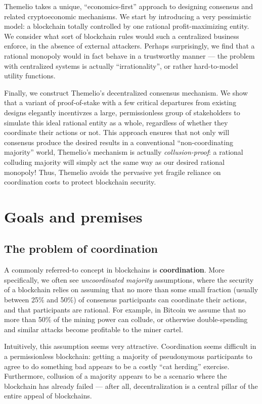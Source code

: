 \documentclass[letterpaper,12pt,oneside]{article}
\begin{document}
Themelio takes a unique, ``economics-first'' approach to designing consensus and related cryptoeconomic mechanisms. We start by introducing a very pessimistic model: a blockchain totally controlled by one rational profit-maximizing entity. We consider what sort of blockchain rules would such a centralized business enforce, in the absence of external attackers. Perhaps surprisingly, we find that a rational monopoly would in fact behave in a trustworthy manner --- the problem with centralized systems is actually ``irrationality'', or rather hard-to-model utility functions.

Finally, we construct Themelio's decentralized consensus mechanism.
We show that a variant of proof-of-stake with a few critical departures from existing designs elegantly incentivzes a large, permissionless group of stakeholders to simulate this ideal rational entity as a whole, regardless of whether they coordinate their actions or not. This approach ensures that not only will consensus produce the desired results in a conventional ``non-coordinating majority'' world, Themelio's mechanism is actually \emph{collusion-proof}: a rational colluding majority will simply act the same way as our desired rational monopoly! Thus, Themelio avoids the pervasive yet fragile reliance on coordination costs to protect blockchain security.

\section{Goals and premises}

\subsection{The problem of coordination}

A commonly referred-to concept in blockchains is \textbf{coordination}. More specifically, we often see \emph{uncoordinated majority} assumptions, where the security of a blockchain relies on assuming that no more than some small fraction (usually between 25\% and 50\%) of consensus participants can coordinate their actions, and that participants are rational. For example, in Bitcoin we assume that no more than 50\% of the mining power can collude, or otherwise double-spending and similar attacks become profitable to the miner cartel.

Intuitively, this assumption seems very attractive. Coordination seems difficult in a permissionless blockchain: getting a majority of pseudonymous participants to agree to do something bad appears to be a costly ``cat herding'' exercise. Furthermore, collusion of a majority appears to be a scenario where the blockchain has already failed --- after all, decentralization is a central pillar of the entire appeal of blockchains.
\end{document}
